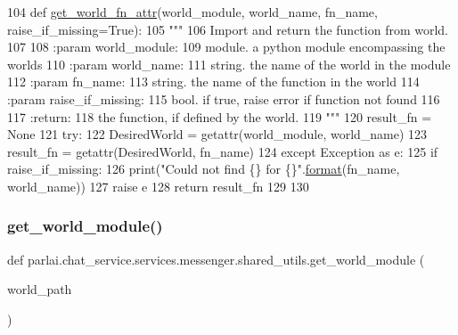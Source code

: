 \begin{DoxyCode}
104 \textcolor{keyword}{def }\hyperlink{namespaceparlai_1_1chat__service_1_1services_1_1messenger_1_1shared__utils_ade421ab07be47db0333a0fac599c07ef}{get\_world\_fn\_attr}(world\_module, world\_name, fn\_name, raise\_if\_missing=True):
105     \textcolor{stringliteral}{"""}
106 \textcolor{stringliteral}{    Import and return the function from world.}
107 \textcolor{stringliteral}{}
108 \textcolor{stringliteral}{    :param world\_module:}
109 \textcolor{stringliteral}{        module. a python module encompassing the worlds}
110 \textcolor{stringliteral}{    :param world\_name:}
111 \textcolor{stringliteral}{        string. the name of the world in the module}
112 \textcolor{stringliteral}{    :param fn\_name:}
113 \textcolor{stringliteral}{        string. the name of the function in the world}
114 \textcolor{stringliteral}{    :param raise\_if\_missing:}
115 \textcolor{stringliteral}{        bool. if true, raise error if function not found}
116 \textcolor{stringliteral}{}
117 \textcolor{stringliteral}{    :return:}
118 \textcolor{stringliteral}{        the function, if defined by the world.}
119 \textcolor{stringliteral}{    """}
120     result\_fn = \textcolor{keywordtype}{None}
121     \textcolor{keywordflow}{try}:
122         DesiredWorld = getattr(world\_module, world\_name)
123         result\_fn = getattr(DesiredWorld, fn\_name)
124     \textcolor{keywordflow}{except} Exception \textcolor{keyword}{as} e:
125         \textcolor{keywordflow}{if} raise\_if\_missing:
126             print(\textcolor{stringliteral}{"Could not find \{\} for \{\}"}.\hyperlink{namespaceparlai_1_1mturk_1_1core_1_1shared__utils_a9cd2c4b48b3efc5296be64d403e00151}{format}(fn\_name, world\_name))
127             \textcolor{keywordflow}{raise} e
128     \textcolor{keywordflow}{return} result\_fn
129 
130 
\end{DoxyCode}
\mbox{\label{namespaceparlai_1_1chat__service_1_1services_1_1messenger_1_1shared__utils_a6285f6c110c5c6fc4ab5d33aaac628f3}} 
\subsubsection{\texorpdfstring{get\+\_\+world\+\_\+module()}{get\_world\_module()}}
{\footnotesize\ttfamily def parlai.\+chat\+\_\+service.\+services.\+messenger.\+shared\+\_\+utils.\+get\+\_\+world\+\_\+module (\begin{DoxyParamCaption}\item[{}]{world\+\_\+path }\end{DoxyParamCaption})}

